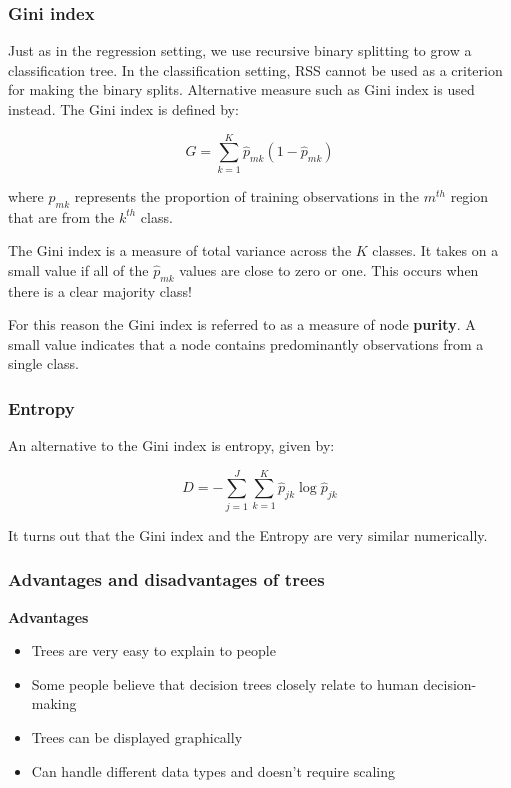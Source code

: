 \subsubsection{Gini index}

\indent 

Just as in the regression setting, we use recursive binary splitting to grow a classification tree. In the classification setting, RSS cannot be used as a criterion for making the binary splits. Alternative measure such as Gini index is used instead. The Gini index is defined by:

\[
G = \sum_{k=1}^K \hat{p}_{mk}(1-\hat{p}_{mk})
\]

where $\hat{p}_{mk}$ represents the proportion of training observations in the $m^{th}$ region that are from the $k^{th}$ class.

The Gini index is a measure of total variance across the $K$ classes. It takes on a small value if all of the $\hat{p}_{mk}$ values are close to zero or one. This occurs when there is a clear majority class!

For this reason the Gini index is referred to as a measure of node \textbf{purity}. A small value indicates that a node contains predominantly observations from a single class.

\subsubsection{Entropy}

\indent

An alternative to the Gini index is entropy, given by:

\[
D = -\sum_{j=1}^J\sum_{k=1}^K \hat{p}_{jk}\log \hat{p}_{jk}
\]

It turns out that the Gini index and the Entropy are very similar numerically.

\subsubsection{Advantages and disadvantages of trees}

\indent

\noindent\textbf{Advantages}

\begin{itemize}
    \item Trees are very easy to explain to people
    \item Some people believe that decision trees closely relate to human decision-making
    \item Trees can be displayed graphically
    \item Can handle different data types and doesn’t require scaling
\end{itemize}

